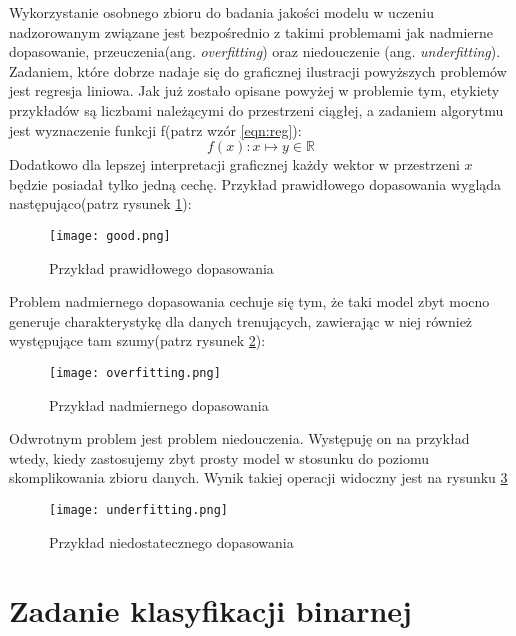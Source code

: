 Wykorzystanie osobnego zbioru do badania jakości modelu w uczeniu nadzorowanym związane jest bezpośrednio z takimi problemami jak nadmierne dopasowanie, przeuczenia(ang. \textit{overfitting}) oraz niedouczenie (ang. \textit{underfitting})\cite{hands_on}. Zadaniem, które dobrze nadaje się do graficznej ilustracji powyższych problemów jest regresja liniowa. Jak już zostało opisane powyżej w problemie tym, etykiety
przykładów są liczbami należącymi do przestrzeni ciągłej, a zadaniem algorytmu jest wyznaczenie funkcji f(patrz wzór \ref{eqn:reg}):
\begin{equation}
	f(x): x \mapsto y \in \mathbb{R}
	\label{eqn:reg}
\end{equation}
Dodatkowo dla lepszej interpretacji graficznej każdy wektor w przestrzeni $x$ będzie posiadał tylko jedną cechę. Przykład prawidłowego dopasowania wygląda następująco(patrz rysunek \ref{fig:probki}):

\begin{figure}[h!]
	\texttt{[image: good.png]}
	\centering
	\caption{Przykład prawidłowego dopasowania}
	\label{fig:probki}
\end{figure}

Problem nadmiernego dopasowania cechuje się tym, że taki model zbyt mocno generuje charakterystykę dla danych trenujących, zawierając w niej również występujące tam szumy(patrz rysunek \ref{fig:overfitting}):

\begin{figure}[h!]
	\texttt{[image: overfitting.png]}
	\centering
	\caption{Przykład nadmiernego dopasowania}
	\label{fig:overfitting}
\end{figure}

Odwrotnym problem jest problem niedouczenia. Występuję on na przykład wtedy, kiedy zastosujemy zbyt prosty model w stosunku do poziomu skomplikowania zbioru danych. Wynik takiej operacji widoczny jest na rysunku \ref{fig:underfitting} 

\begin{figure}[h!]
	\texttt{[image: underfitting.png]}
	\centering
	\caption{Przykład niedostatecznego dopasowania}
	\label{fig:underfitting}
\end{figure}

\section{Zadanie klasyfikacji binarnej}

